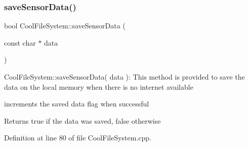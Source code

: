 \subsubsection{\texorpdfstring{save\+Sensor\+Data()}{saveSensorData()}}
{\footnotesize\ttfamily bool Cool\+File\+System\+::save\+Sensor\+Data (\begin{DoxyParamCaption}\item[{const char $\ast$}]{data }\end{DoxyParamCaption})}

Cool\+File\+System\+::save\+Sensor\+Data( data )\+: This method is provided to save the data on the local memory when there is no internet available

increments the saved data flag when successful

\begin{DoxyReturn}{Returns}
true if the data was saved, false otherwise 
\end{DoxyReturn}


Definition at line 80 of file Cool\+File\+System.\+cpp.


